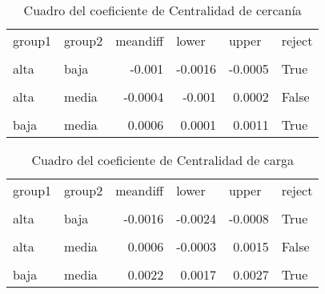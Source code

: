\documentclass{article}
\begin{document}
\begin{table}[htbp]
  \centering
  \caption{Cuadro del coeficiente de Centralidad de cercanía}
    \begin{tabular}{llrrrl}
    group1 & group2 & \multicolumn{1}{l}{meandiff} & \multicolumn{1}{l}{lower} & \multicolumn{1}{l}{upper} & reject \\
          &       &       &       &       &  \\
    alta  & baja  & -0.001 & -0.0016 & -0.0005 & True \\
          &       &       &       &       &  \\
    alta  & media & -0.0004 & -0.001 & 0.0002 & False \\
          &       &       &       &       &  \\
    baja  & media & 0.0006 & 0.0001 & 0.0011 & True \\
    \end{tabular}%
  \label{tab:addlabel}%
\end{table}%



\begin{table}[htbp]
  \centering
  \caption{Cuadro del coeficiente de Centralidad de carga}
    \begin{tabular}{llrrrl}
    group1 & group2 & \multicolumn{1}{l}{meandiff} & \multicolumn{1}{l}{lower} & \multicolumn{1}{l}{upper} & reject \\
          &       &       &       &       &  \\
    alta  & baja  & -0.0016 & -0.0024 & -0.0008 & True \\
          &       &       &       &       &  \\
    alta  & media & 0.0006 & -0.0003 & 0.0015 & False \\
          &       &       &       &       &  \\
    baja  & media & 0.0022 & 0.0017 & 0.0027 & True \\
    \end{tabular}%
  \label{tab:addlabel}%
\end{table}%
\end{document}
